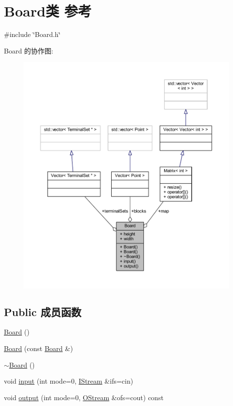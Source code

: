 \hypertarget{classBoard}{}\section{Board类 参考}
\label{classBoard}


{\ttfamily \#include \char`\"{}Board.\+h\char`\"{}}



Board 的协作图\+:
\nopagebreak
\begin{figure}[H]
\begin{center}
\leavevmode
\includegraphics[width=350pt]{classBoard__coll__graph}
\end{center}
\end{figure}
\subsection*{Public 成员函数}
\begin{DoxyCompactItemize}
\item 
\hyperlink{classBoard_a9ee491d4fea680cf69b033374a9fdfcb}{Board} ()
\item 
\hyperlink{classBoard_a19e2c1f6c2baf8ab04cbd02f0cd2aebc}{Board} (const \hyperlink{classBoard}{Board} \&)
\item 
\hyperlink{classBoard_af73f45730119a1fd8f6670f53f959e68}{$\sim$\+Board} ()
\item 
void \hyperlink{classBoard_ace215dfac6b741c9fb51cc40a6fe6ab1}{input} (int mode=0, \hyperlink{global_8h_a3ae955d826788591b03995dc737012c7}{I\+Stream} \&ifs=cin)
\item 
void \hyperlink{classBoard_a88190948cb3ed605cb54355de513cfa6}{output} (int mode=0, \hyperlink{global_8h_a4fcce0eedf9be71754b55a7e7a6d7f50}{O\+Stream} \&ofs=cout) const 
\end{DoxyCompactItemize}
